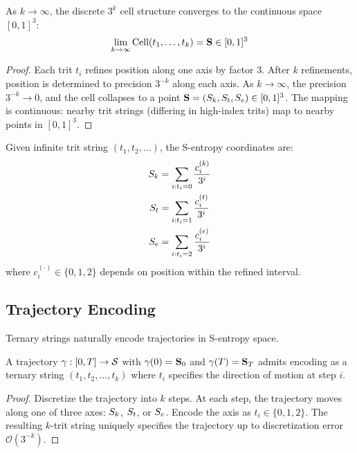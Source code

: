 \begin{theorem}
\label{thm:continuous_emergence}
As $k \to \infty$, the discrete $3^k$ cell structure converges to the continuous space $[0,1]^3$:
\begin{equation}
\lim_{k \to \infty} \text{Cell}(t_1,\ldots,t_k) = \mathbf{S} \in [0,1]^3
\end{equation}
\end{theorem}

\begin{proof}
Each trit $t_i$ refines position along one axis by factor $3$. After $k$ refinements, position is determined to precision $3^{-k}$ along each axis. As $k \to \infty$, the precision $3^{-k} \to 0$, and the cell collapses to a point $\mathbf{S} = (S_k, S_t, S_e) \in [0,1]^3$. The mapping is continuous: nearby trit strings (differing in high-index trits) map to nearby points in $[0,1]^3$.
\end{proof}

\begin{corollary}
Given infinite trit string $(t_1,t_2,\ldots)$, the S-entropy coordinates are:
\begin{align}
S_k &= \sum_{i: t_i=0} \frac{c_i^{(k)}}{3^i} \\
S_t &= \sum_{i: t_i=1} \frac{c_i^{(t)}}{3^i} \\
S_e &= \sum_{i: t_i=2} \frac{c_i^{(e)}}{3^i}
\end{align}
where $c_i^{(\cdot)} \in \{0,1,2\}$ depends on position within the refined interval.
\end{corollary}

\subsection{Trajectory Encoding}

Ternary strings naturally encode trajectories in S-entropy space.

\begin{theorem}
\label{thm:trajectory_encoding}
A trajectory $\gamma: [0,T] \to \mathcal{S}$ with $\gamma(0) = \mathbf{S}_0$ and $\gamma(T) = \mathbf{S}_T$ admits encoding as a ternary string $(t_1,t_2,\ldots,t_k)$ where $t_i$ specifies the direction of motion at step $i$.
\end{theorem}

\begin{proof}
Discretize the trajectory into $k$ steps. At each step, the trajectory moves along one of three axes: $S_k$, $S_t$, or $S_e$. Encode the axis as $t_i \in \{0,1,2\}$. The resulting $k$-trit string uniquely specifies the trajectory up to discretization error $\mathcal{O}(3^{-k})$.
\end{proof}

